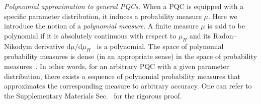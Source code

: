 \documentclass[%
 superscriptaddress,
 aps,prl,
 reprint,
 twocolumn,
 amsmath,amssymb,showpacs,
 bibnotes,
]{revtex4-2}
\newcommand{\RomanNumeralCaps}[1]
    {\MakeUppercase{\romannumeral #1}}
\newcommand*{\dif}{\mathop{}\!\mathrm{d}}
\begin{document}
\emph{\label{sec:3} Polynomial approximation to general PQCs.}
When a PQC is equipped with a specific parameter distribution, it induces a probability measure $\mu$.
Here we introduce the notion of a {\itshape polynomial measure}. A finite measure $\mu$ is said to be polynomial if it is absolutely continuous with respect to $\mu_H$ and its Radon–Nikodym derivative $\mathrm{d}\mu/\mathrm{d}\mu_H$~\cite{folland1999real} is a polynomial.
The space of polynomial probability measures is dense (in an appropriate sense) in the space of probability measures~\cite{denseness_note}.
In other words, for an arbitrary PQC with a given parameter distribution, there exists a sequence of polynomial probability measures that approximates the corresponding measure to arbitrary accuracy. One can refer to the Supplementary Materials Sec.~\RomanNumeralCaps{3} for the rigorous proof.
\end{document}
